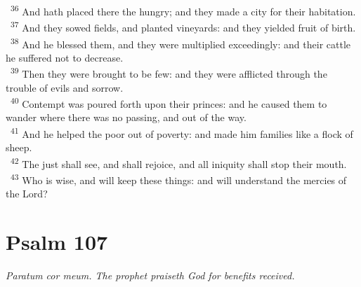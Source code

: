\documentclass[a5paper,12pt]{article}
\begin{document}
\begin{multicols*}{2}
~\textsuperscript{36} And hath placed there the hungry; and they made a city for their habitation.\\
~\textsuperscript{37} And they sowed fields, and planted vineyards: and they yielded fruit of birth.\\
~\textsuperscript{38} And he blessed them, and they were multiplied exceedingly: and their cattle he suffered not to decrease.\\
~\textsuperscript{39} Then they were brought to be few: and they were afflicted through the trouble of evils and sorrow.\\
~\textsuperscript{40} Contempt was poured forth upon their princes: and he caused them to wander where there was no passing, and out of the way.\\
~\textsuperscript{41} And he helped the poor out of poverty: and made him families like a flock of sheep.\\
~\textsuperscript{42} The just shall see, and shall rejoice, and all iniquity shall stop their mouth.\\
~\textsuperscript{43} Who is wise, and will keep these things: and will understand the mercies of the Lord?\\

\section{Psalm 107}
\label{sec:orgbfa9dbb}
\emph{Paratum cor meum. The prophet praiseth God for benefits received.}\\


\end{multicols*}
\end{document}
